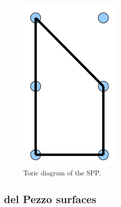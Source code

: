 \documentclass{worksheetclass}
\begin{document}
        \begin{figure}
            \centering
            \includegraphics[scale=0.4]{Pictures/SPPtoricdiagram.png}
            \caption{Toric diagram of the SPP.}
        \end{figure}

    \subsection{del Pezzo surfaces}

\printbibliography
\end{document}
